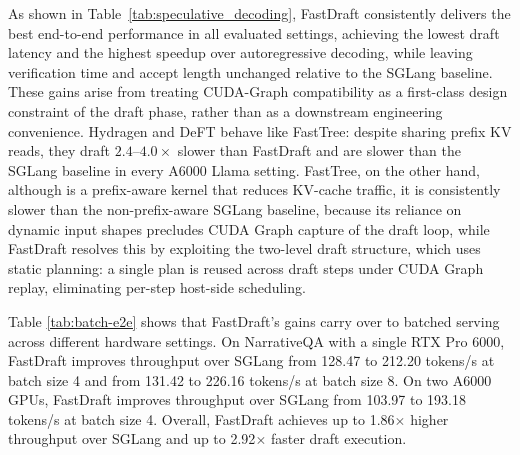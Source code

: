 \documentclass{article}
\begin{document}
As shown in Table~\ref{tab:speculative_decoding},
FastDraft consistently delivers the best end-to-end performance in all evaluated settings, achieving the lowest draft latency and the highest speedup over autoregressive decoding, while leaving verification time and accept length unchanged relative to the SGLang baseline. These gains arise from treating CUDA-Graph compatibility as a first-class design constraint of the draft phase, rather than as a downstream engineering convenience. Hydragen and DeFT behave like FastTree: despite sharing prefix KV reads, they draft $2.4$--$4.0\times$ slower than FastDraft and are slower than the SGLang baseline in every A6000 Llama setting. FastTree, on the other hand,  although is a prefix-aware kernel that reduces KV-cache traffic, it is consistently slower than the non-prefix-aware SGLang baseline, because its reliance on dynamic input shapes precludes CUDA Graph capture of the draft loop, while FastDraft resolves this by exploiting the two-level draft structure, which uses static planning: a single plan is reused across draft steps under CUDA Graph replay, eliminating per-step host-side scheduling.

Table \ref{tab:batch-e2e} shows that FastDraft's gains carry over to batched serving across different hardware settings. On NarrativeQA with a single RTX Pro 6000, FastDraft improves throughput over SGLang from 128.47 to 212.20 tokens/s at batch size 4 and from 131.42 to 226.16 tokens/s at batch size 8. On two A6000 GPUs, FastDraft improves throughput over SGLang from 103.97 to 193.18 tokens/s at batch size 4. Overall, FastDraft achieves up to 1.86$\times$ higher throughput over SGLang and up to 2.92$\times$ faster draft execution.


\end{document}
